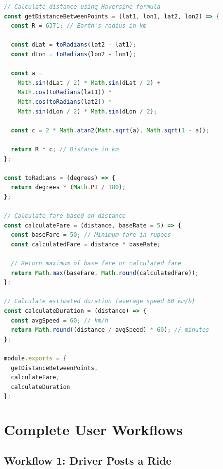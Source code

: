 \documentclass[12pt,a4paper]{article}
\begin{document}
\begin{lstlisting}[language=JavaScript, caption=Distance and Fare Calculation]
// Calculate distance using Haversine formula
const getDistanceBetweenPoints = (lat1, lon1, lat2, lon2) => {
  const R = 6371; // Earth's radius in km
  
  const dLat = toRadians(lat2 - lat1);
  const dLon = toRadians(lon2 - lon1);
  
  const a = 
    Math.sin(dLat / 2) * Math.sin(dLat / 2) +
    Math.cos(toRadians(lat1)) * 
    Math.cos(toRadians(lat2)) *
    Math.sin(dLon / 2) * Math.sin(dLon / 2);
  
  const c = 2 * Math.atan2(Math.sqrt(a), Math.sqrt(1 - a));
  
  return R * c; // Distance in km
};

const toRadians = (degrees) => {
  return degrees * (Math.PI / 180);
};

// Calculate fare based on distance
const calculateFare = (distance, baseRate = 5) => {
  const baseFare = 50; // Minimum fare in rupees
  const calculatedFare = distance * baseRate;
  
  // Return maximum of base fare or calculated fare
  return Math.max(baseFare, Math.round(calculatedFare));
};

// Calculate estimated duration (average speed 60 km/h)
const calculateDuration = (distance) => {
  const avgSpeed = 60; // km/h
  return Math.round((distance / avgSpeed) * 60); // minutes
};

module.exports = {
  getDistanceBetweenPoints,
  calculateFare,
  calculateDuration
};
\end{lstlisting}

\newpage

\section{Complete User Workflows}

\subsection{Workflow 1: Driver Posts a Ride}
\end{document}
